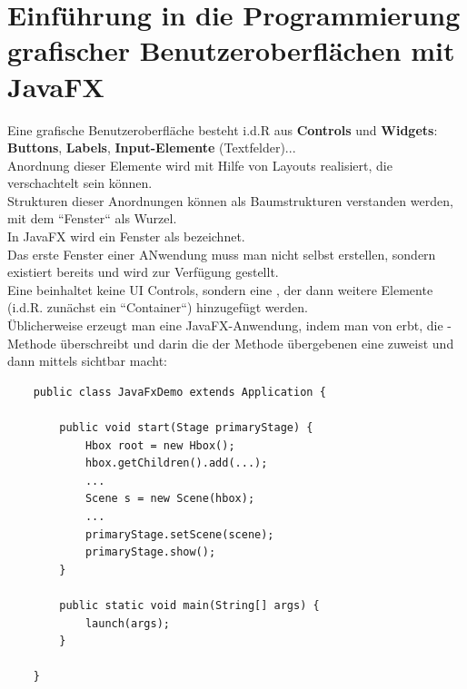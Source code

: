 \section{Einführung in die Programmierung grafischer Benutzeroberflächen mit JavaFX}


Eine grafische Benutzeroberfläche besteht i.d.R aus \textbf{Controls} und \textbf{Widgets}: \textbf{Buttons}, \textbf{Labels}, \textbf{Input-Elemente} (Textfelder)...\\

\noindent
Anordnung dieser Elemente wird mit Hilfe von Layouts realisiert, die verschachtelt sein können.\\

\noindent
Strukturen dieser Anordnungen können als Baumstrukturen verstanden werden, mit dem ``Fenster`` als Wurzel.\\

\noindent
In JavaFX wird ein Fenster als  bezeichnet.\\

\noindent
Das erste Fenster einer ANwendung muss man nicht selbst erstellen, sondern existiert bereits und wird zur Verfügung gestellt.\\

\noindent
Eine  beinhaltet keine UI Controls, sondern eine , der dann weitere Elemente (i.d.R. zunächst ein ``Container``) hinzugefügt werden.\\

\noindent
Üblicherweise erzeugt man eine JavaFX-Anwendung, indem man von  erbt, die -Methode überschreibt und darin die der Methode übergebenen  eine  zuweist und dann mittels  sichtbar macht:

\begin{verbatim}
    public class JavaFxDemo extends Application {

        public void start(Stage primaryStage) {
            Hbox root = new Hbox();
            hbox.getChildren().add(...);
            ...
            Scene s = new Scene(hbox);
            ...
            primaryStage.setScene(scene);
            primaryStage.show();
        }

        public static void main(String[] args) {
            launch(args);
        }

    }
\end{verbatim}\\

